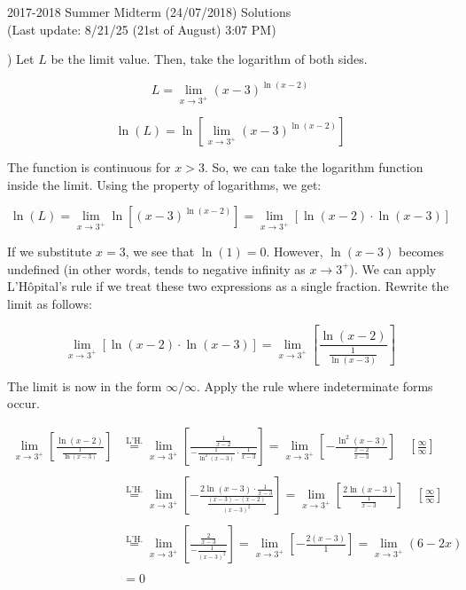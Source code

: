 \documentclass{article}
\begin{document}
\hfill

\newpage

\begin{center}
2017-2018 Summer Midterm (24/07/2018) Solutions\\
(Last update: 8/21/25 (21st of August) 3:07 PM)
\end{center}

) Let $L$ be the limit value. Then, take the logarithm of both sides.

\[L = \lim_{x\to3^+}(x-3)^{\ln(x-2)}\]

\[\ln(L) = \ln\left[\lim_{x\to3^+}(x-3)^{\ln(x-2)}\right]\]

\hfill

\noindent The function is continuous for $x > 3$. So, we can take the logarithm function inside the limit. Using the property of logarithms, we get:

\[\ln(L) = \lim_{x\to3^+}\ln\left[(x-3)^{\ln(x-2)}\right] = \lim_{x\to3^+}\left[\ln(x-2)\cdot \ln(x-3)\right]\]

\hfill

\noindent If we substitute $x=3$, we see that $\ln(1) = 0$. However, $\ln(x-3)$ becomes undefined (in other words, tends to negative infinity as $x\to3^+$). We can apply L'Hôpital's rule if we treat these two expressions as a single fraction. Rewrite the limit as follows:

\[\lim_{x\to3^+}\left[\ln(x-2) \cdot \ln(x-3)\right] =\lim_{x\to3^+}\left[\frac{\ln(x-2)}{\frac{1}{\ln(x-3)}}\right]  \]

\hfill

\noindent The limit is now in the form $\infty/\infty$. Apply the rule where indeterminate forms occur.

\begin{align*}
    \lim_{x\to3^+}\left[\frac{\ln(x-2)}{\frac{1}{\ln(x-3)}}\right] &\overset{\text{L'H.}}{=} \lim_{x\to3^+} \left[\frac{\frac{1}{x-2}}{-\frac{1}{\ln^2(x-3)}\cdot {\frac{1}{x-3}}}\right] = \lim_{x\to3^+} \left[-\frac{\ln^2(x-3)}{\frac{x-2}{x-3}}\right] \quad \left[\frac{\infty}{\infty}\right] \\\\
    &\overset{\text{L'H.}}{=} \lim_{x\to3^+}\left[-\frac{2\ln(x-3)\cdot\frac{1}{x-3}}{\frac{(x-3) -(x-2)}{(x-3)^2}}\right] = \lim_{x\to3^+} \left[\frac{2\ln(x-3)}{\frac{1}{x-3}}\right] \quad \left[\frac{\infty}{\infty}\right] \\\\
    &\overset{\text{L'H.}}{=} \lim_{x\to3^+} \left[\frac{\frac{2}{x-3}}{-\frac{1}{(x-3)^2}}\right] = \lim_{x\to3^+} \left[-\frac{2(x-3)}{1}\right]=\lim_{x\to3^+} (6-2x)\\\\&=0
\end{align*}
\end{document}
